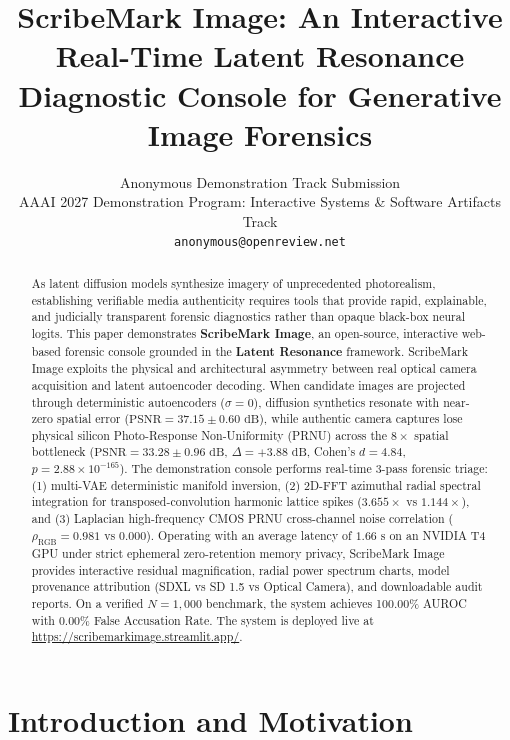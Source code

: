 \documentclass[letterpaper]{article}
\title{ScribeMark Image: An Interactive Real-Time Latent Resonance Diagnostic Console for Generative Image Forensics}
\author{
    Anonymous Demonstration Track Submission\\
    AAAI 2027 Demonstration Program: Interactive Systems \& Software Artifacts Track\\
    \texttt{anonymous@openreview.net}
}
\begin{document}
\maketitle

\begin{abstract}
As latent diffusion models synthesize imagery of unprecedented photorealism, establishing verifiable media authenticity requires tools that provide rapid, explainable, and judicially transparent forensic diagnostics rather than opaque black-box neural logits. This paper demonstrates \textbf{ScribeMark Image}, an open-source, interactive web-based forensic console grounded in the \textbf{Latent Resonance} framework. ScribeMark Image exploits the physical and architectural asymmetry between real optical camera acquisition and latent autoencoder decoding. When candidate images are projected through deterministic autoencoders ($\sigma = 0$), diffusion synthetics resonate with near-zero spatial error ($\text{PSNR} = 37.15 \pm 0.60\text{ dB}$), while authentic camera captures lose physical silicon Photo-Response Non-Uniformity (PRNU) across the $8\times$ spatial bottleneck ($\text{PSNR} = 33.28 \pm 0.96\text{ dB}$, $\Delta = +3.88\text{ dB}$, Cohen's $d = 4.84$, $p = 2.88 \times 10^{-165}$). The demonstration console performs real-time 3-pass forensic triage: (1) multi-VAE deterministic manifold inversion, (2) 2D-FFT azimuthal radial spectral integration for transposed-convolution harmonic lattice spikes ($3.655\times$ vs $1.144\times$), and (3) Laplacian high-frequency CMOS PRNU cross-channel noise correlation ($\rho_{\text{RGB}} = 0.981$ vs $0.000$). Operating with an average latency of $1.66\text{ s}$ on an NVIDIA T4 GPU under strict ephemeral zero-retention memory privacy, ScribeMark Image provides interactive residual magnification, radial power spectrum charts, model provenance attribution (SDXL vs SD 1.5 vs Optical Camera), and downloadable audit reports. On a verified $N=1,000$ benchmark, the system achieves 100.00\% AUROC with 0.00\% False Accusation Rate. The system is deployed live at \url{https://scribemarkimage.streamlit.app/}.
\end{abstract}

\section{Introduction and Motivation}
\label{sec:intro}
\end{document}
